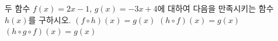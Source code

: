 두 함수 $f(x)=2x-1$, $g(x)=-3x+4$에 대하여 다음을 만족시키는 함수 $h(x)$를 구하시오.
 $(f\circ h)(x)=g(x)$
 $(h\circ f)(x)=g(x)$
 $(h\circ g\circ f)(x)=g(x)$
